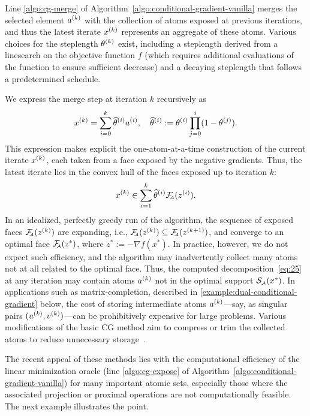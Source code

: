 Line \ref{algo:cg-merge} of Algorithm~\ref{algo:conditional-gradient-vanilla} merges the
selected element $a^{(k)}$ with the collection of atoms exposed at previous
iterations, and thus the latest iterate $x^{(k)}$ represents an aggregate of these
atoms. Various choices for the steplength $\theta^{(k)}$ exist, including a
steplength derived from a linesearch on the objective function $f$ (which
requires additional evaluations of the function to ensure sufficient decrease)
and a decaying steplength that follows a predetermined schedule.

We express the merge step at iteration $k$ recursively as
\begin{equation}
  \label{eq:25}  x^{(k)} = \sum_{i=0}^k\widehat\theta^{(i)}a^{(i)},
  \quad
  \widehat\theta^{(i)}:=\theta^{(i)}\prod_{j=0}^i(1-\theta^{(j)}).
\end{equation}
This expression makes explicit the one-atom-at-a-time construction of the
current iterate $x^{(k)}$, each taken from a face exposed by the negative gradients.
Thus, the latest iterate lies in the convex hull of the faces exposed up to
iteration $k$:
\[
  x^{(k)} \in \sum_{i=1}^k\widehat\theta^{(i)}\mathcal{F}_{\!\!\scriptscriptstyle\mathcal{A}}(z^{(i)}).
\]
In an idealized, perfectly greedy run of the algorithm, the sequence of exposed
faces $\mathcal{F}_{\!\!\scriptscriptstyle\mathcal{A}}(z^{(k)})$ are expanding, i.e., $\mathcal{F}_{\!\!\scriptscriptstyle\mathcal{A}}(z^{(k)})\subseteq\mathcal{F}_{\!\!\scriptscriptstyle\mathcal{A}}(z^{(k+1)})$,
and converge to an optimal face $\mathcal{F}_{\!\!\scriptscriptstyle\mathcal{A}}(z^*)$, where $z^*:=-\nabla f(x^*)$. In
practice, however, we do not expect such efficiency, and the algorithm may
inadvertently collect many atoms not at all related to the optimal face. Thus,
the computed decomposition~\eqref{eq:25} at any iteration may contain atoms
$a^{(k)}$ not in the optimal support $\operatorname{\mathcal{S}_{\scriptscriptstyle\mathcal{A}}}(x^*)$. In applications such as
matrix-completion, described in \autoref{example:dual-conditional-gradient} below,
the cost of storing intermediate atoms $a^{(k)}$---say, as singular pairs
$(u^{(k)},v^{(k)})$---can be prohibitively expensive for large problems. Various
modifications of the basic CG method aim to compress or trim the collected atoms
to reduce unnecessary storage~\cite{rao2015forward}.

The recent appeal of these methods lies with the computational efficiency of the
linear minimization oracle (line \ref{algo:cg-expose} of
Algorithm~\ref{algo:conditional-gradient-vanilla}) for many important atomic sets,
especially those where the associated projection or proximal operations are not
computationally feasible. The next example illustrates the point.

